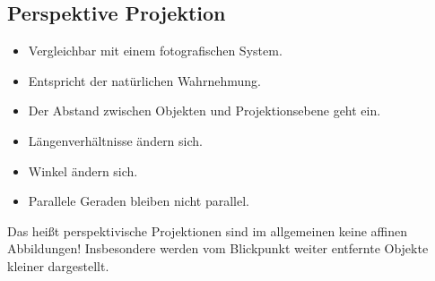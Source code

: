 \documentclass[a4paper, 11pt, accentcolor = tud3b]{tudreport}
\begin{document}
			\subsection{Perspektive Projektion}
				\begin{itemize}
					\item Vergleichbar mit einem fotografischen System.
					\item Entspricht der natürlichen Wahrnehmung.
					\item Der Abstand zwischen Objekten und Projektionsebene geht ein.
					\item Längenverhältnisse ändern sich.
					\item Winkel ändern sich.
					\item Parallele Geraden bleiben nicht parallel.
				\end{itemize}
			
				Das heißt perspektivische Projektionen sind im allgemeinen keine affinen Abbildungen! Insbesondere werden vom Blickpunkt weiter entfernte Objekte kleiner dargestellt.
				
\end{document}

